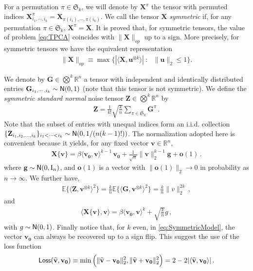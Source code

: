 \documentclass[11pt]{article}
\theoremstyle{definition}
\def\Loss{{\sf Loss}}
\def\<{\langle}
\def\>{\rangle}
\def\E{{\mathbb E}} %
\def\reals{\mathbb{R}}
\def\bu{\mathbf{u}}
\def\bv{\mathbf{v}}
\def\bo{\mathbf{o}}
\def\hbv{\mathbf{\widehat{v}}}
\def\bg{\mathbf{g}}
\def\bvz{\mathbf{v_0}}
\def\bX{\mathbf{X}}
\def\bZ{\mathbf{Z}}
\def\bG{\mathbf{G}}
\def\E{\mathbb{E}}
\def\normal{{\sf N}}
\def\ok{{^{\otimes k}}}
\def\id{{\rm I}}
\begin{document}
For a permutation $\pi \in \mathfrak S_k$, we will denote by $\bX^\pi$ the tensor
with permuted indices $\bX^\pi_{i_1, \cdots, i_k} = \bX_{\pi(i_1),
  \cdots , \pi(i_k)}$. We call the tensor $\bX$ \emph{symmetric} if,
for any permutation $\pi \in \mathfrak S_k$, $\bX^\pi = \bX$. 
It is proved \cite{Waterhouse90} that, for symmetric tensors, 
the value of problem \ref{eq:TPCA} coincides with $\|\bX\|_{op}$ up to
a sign.
More precisely, for symmetric tensors we have the equivalent
representation
%
\begin{align}
%
\|\bX\|_{op} \equiv\max \{ |\< \bX,\bu\ok\>|~:~~~\|\bu\|_2\leq 1 \}.
%
\end{align}
%


We denote by  $\bG \in \bigotimes^k \reals^n$  a tensor with
independent and identically distributed entries 
$\bG_{i_1, \cdots, i_k}\sim\normal(0,1)$ (note that this tensor is not symmetric).
We define the {\em symmetric standard normal} noise tensor $\bZ \in \bigotimes^k \reals^n$
by
%
\begin{align}\label{eq:symNoiseDefinition}
%
\bZ =\frac{1}{k!  }\sqrt{\frac k n} \sum_{\pi \in \mathfrak S_k }
\bG^\pi\, .
%
\end{align}
%
Note  that the subset of entries with unequal indices form an i.i.d.
collection $\{\bZ_{i_1,i_2,\dots,i_k} \}_{i_1<\dots<i_k} \sim \normal(
0,1/(n(k-1)!))$.
The normalization adopted here is convenient because it yields, for
any fixed vector $\bv\in\reals^{n}$,
%
\begin{align}
%
\bX\{\bv\} = \beta\<\bvz,\bv\>^{k-1}\, \bvz +
\frac 1 {\sqrt{ n}} \|\bv\|^{k-1}_2\bg + \bo(1)\, .\label{eq:XMultiplication}
%
\end{align}
%
where $\bg\sim\normal(0,\id_{n})$, and $\bo(1)$ is a vector with
$\|\bo(1)\|_2\to 0$ in probability as $n\to\infty$. We further have, 
%
\begin{align}
%
\E\big\{\< \bZ , \bv^{\otimes k}\>^2\big\} =\frac{k}{n}\E
\big\{ \< \bG, \bv^{\otimes k} \>^2\big\} =\frac{k}{n}
\|v\|_2^{2k} \, ,
%
\end{align}
%
and 
%
\begin{align}\label{eq:XvvvDistribution}
\< \bX\{\bv\},\bv\>  = \beta\<\bvz,\bv\>^k+\sqrt{\frac k n} g\, ,
\end{align}
%
with $g\sim\normal(0,1)$. 
Finally notice that, for $k$ even, in  \ref{eq:SymmetricModel}, the
vector $\bvz$ can always be recovered up to a sign flip. This suggest
the use of the loss function
%
\begin{align}
%
\Loss(\hbv,\bvz) \equiv
\min\Big(\|\hbv-\bvz\|^2_2,\|\hbv+\bvz\|^2_2\Big) =
2-2|\<\hbv,\bvz\>|\, .
%
\end{align}
%
\end{document}
